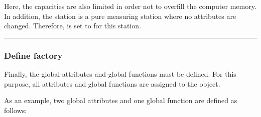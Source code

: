 \documentclass[letterpaper,10pt,english]{sphinxmanual}
\begin{document}
\sphinxAtStartPar
Here, the capacities are also limited in order not to overfill the computer memory. In addition, the station
 is a pure measuring station where no attributes are changed. Therefore,  is set to 
for this station.

\begin{sphinxVerbatim}[commandchars=\\\{\}]
    \PYG{p}{[}
       
       
       
       
       
       
       
       
       
       
       
  \PYG{p}{]}
\end{sphinxVerbatim}


\bigskip\hrule\bigskip



\subsubsection{Define factory}
\label{\detokenize{source/Examples/example01:define-factory}}\label{\detokenize{source/Examples/example01:id3}}
\sphinxAtStartPar
Finally, the global attributes and global functions must be defined. For this purpose, all attributes and global
functions are assigned to the  object.

\sphinxAtStartPar
As an example, two global attributes and one global function are defined as follows:
\end{document}
